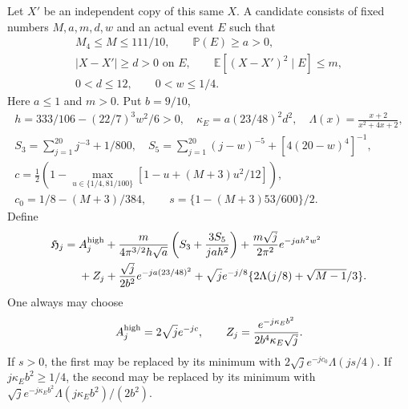 \documentclass[aop,preprint]{imsart}
\theoremstyle{definition}
\newcommand{\E}{\mathbb E}
\newcommand{\PP}{\mathbb P}
\numberwithin{equation}{section}
\begin{document}
Let $X'$ be an independent copy of this same $X$. A candidate consists
of fixed numbers $M,a,m,d,w$ and an actual event $E$ such that
\begin{equation}\label{ut:event-input}
\begin{gathered}
 M_4\le M\le111/10,\qquad\PP(E)\ge a>0,\\
 |X-X'|\ge d>0\text{ on }E,\qquad
 \E[(X-X')^2\mid E]\le m,\\
 0<d\le12,\qquad0<w\le1/4.
\end{gathered}
\end{equation}
Here $a\le1$ and $m>0$. Put $b=9/10$,
\begin{gather*}
 h=333/106-(22/7)^3w^2/6>0,\quad
 \kappa_E=a(23/48)^2d^2,\quad
 \Lambda(x)=\frac{x+2}{x^2+4x+2},\\
 S_3=\sum_{j=1}^{20}j^{-3}+1/800,\quad
 S_5=\sum_{j=1}^{20}(j-w)^{-5}+[4(20-w)^4]^{-1},\\
 c=\tfrac12\left(1-\max_{u\in\{1/4,81/100\}}
                    [1-u+(M+3)u^2/12]\right),\\
 c_0=1/8-(M+3)/384,\qquad s=\{1-(M+3)53/600\}/2.
\end{gather*}
Define
\begin{align}\label{ut:high-six}
 \mathfrak H_j={}&A_j^{\rm high}
 +\frac{m}{4\pi^{3/2}h\sqrt a}
                \left(S_3+\frac{3S_5}{jah^2}\right)
 +\frac{m\sqrt j}{2\pi^2}e^{-jah^2w^2}\notag\\
 &+Z_j+\frac{\sqrt j}{2b^2}e^{-ja(23/48)^2}
 +\sqrt j e^{-j/8}\{2\Lambda(j/8)+\sqrt{M-1}/3\}.
\end{align}
One always may choose
\[
 A_j^{\rm high}=2\sqrt j e^{-jc},\qquad
 Z_j=\frac{e^{-j\kappa_Eb^2}}{2b^4\kappa_E\sqrt j}.
\]
If $s>0$, the first may be replaced by its minimum with
$2\sqrt j e^{-jc_0}\Lambda(js/4)$.
If $j\kappa_Eb^2\ge1/4$, the second may be replaced by its minimum
with $\sqrt j e^{-j\kappa_Eb^2}\Lambda(j\kappa_Eb^2)/(2b^2)$.
\end{document}
